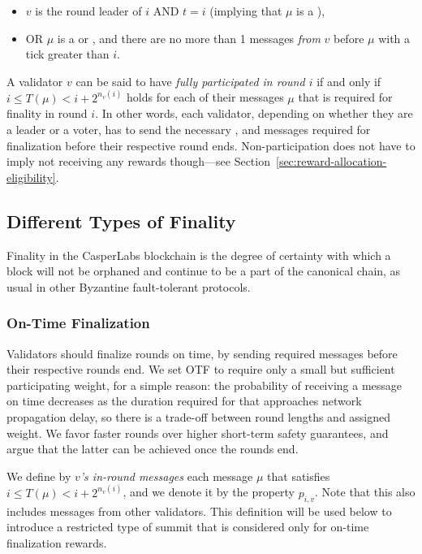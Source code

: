\begin{itemize}
\item
  $v$ is the round leader of $i$ AND $t = i$ (implying that $\mu$ is a \PROP),
\item
  OR $\mu$ is a \CONF or \WIT, and there are no more than 1 messages
  \emph{from} $v$ before $\mu$ with a tick greater than $i$.
\end{itemize}

A validator $v$ can be said to have \emph{fully participated in round $i$} if and only if $i \leq T(\mu) <i+2^{n_v(i)}$ holds for each of their messages $\mu$ that is required for finality in round $i$. In other words, each validator, depending on whether they are a leader or a voter, has to send the necessary \PROP, \CONF and \WIT messages required for finalization before their respective round ends. Non-participation does not have to imply not receiving any rewards though---see Section~\ref{sec:reward-allocation-eligibility}.




\subsection{Different Types of Finality}
\label{sec:finality-criteria}

Finality in the CasperLabs blockchain is the degree of certainty with which a block will not be orphaned and continue to be a part of the canonical chain, as usual in other Byzantine fault-tolerant protocols.

\subsubsection*{On-Time Finalization}
\label{sec:on-time-finalization}

Validators should finalize rounds on time, by sending required messages before their respective rounds end. We set OTF to require only a small but sufficient participating weight, for a simple reason: the probability of receiving a message on time decreases as the duration required for that approaches network propagation delay, so there is a trade-off between round lengths and assigned weight. We favor faster rounds over higher short-term safety guarantees, and argue that the latter can be achieved once the rounds end.


We define by \emph{$v$'s in-round messages} each message $\mu$ that satisfies $i \leq T(\mu)< i+2^{n_v(i)}$, and we denote it by the property $p_{i,v}$. Note that this also includes messages from other validators. This definition will be used below to introduce a restricted type of summit that is considered only for on-time finalization rewards.


